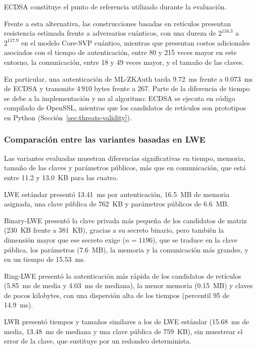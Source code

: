 ECDSA constituye el punto de referencia utilizado durante la evaluación.

Frente a esta alternativa, las construcciones basadas en retículos presentan
resistencia estimada frente a adversarios cuánticos, con una dureza de $2^{116.3}$ a $2^{117.9}$ en el modelo Core-SVP cuántico, mientras que presentan costos adicionales asociados
con el tiempo de autenticación, entre 80 y 215 veces mayor en este entorno, la comunicación, entre 18 y 49 veces mayor, y el tamaño de las claves.

En particular,
una autenticación de ML-ZKAuth tarda 9.72~ms frente a 0.073~ms de ECDSA y transmite 4\,910 bytes frente a 267. Parte de la diferencia de tiempo se debe a la implementación y no al algoritmo: ECDSA se ejecuta en código compilado de OpenSSL, mientras que los candidatos de retículos son prototipos en Python (Sección~\ref{sec:threats-validity}).


\subsubsection{Comparación entre las variantes basadas en LWE}
\label{subsec:lwe-comparison}

Las variantes evaluadas muestran diferencias significativas en
tiempo, memoria, tamaño de las claves y parámetros públicos, más que en comunicación, que está entre 11.2 y 13.0~KB para las cuatro.

LWE estándar presentó
13.41~ms por autenticación, 16.5~MB de memoria asignada, una clave pública de 762~KB y parámetros públicos de 6.6~MB.

Binary-LWE presentó
la clave privada más pequeña de los candidatos de matriz (230~KB frente a 381~KB), gracias a su secreto binario, pero también la dimensión mayor que ese secreto exige ($n = 1196$), que se traduce en la clave pública, los parámetros (7.6~MB), la memoria y la comunicación más grandes, y en un tiempo de 15.53~ms.

Ring-LWE presentó
la autenticación más rápida de los candidatos de retículos (5.85~ms de media y 4.03~ms de mediana), la menor memoria (0.15~MB) y claves de pocos kilobytes, con una dispersión alta de los tiempos (percentil 95 de 14.9~ms).

LWR presentó
tiempos y tamaños similares a los de LWE estándar (15.68~ms de media, 13.48~ms de mediana y una clave pública de 759~KB), sin muestrear el error de la clave, que sustituye por un redondeo determinista.

